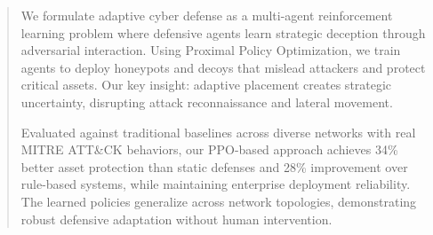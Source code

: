 \documentclass[12pt,oneside]{article}
\begin{document}



\tableofcontents
\clearpage  %

\begin{abstract}

\vspace{1em} %

We formulate adaptive cyber defense as a multi-agent reinforcement learning problem where defensive agents learn strategic deception through adversarial interaction. Using Proximal Policy Optimization, we train agents to deploy honeypots and decoys that mislead attackers and protect critical assets. Our key insight: adaptive placement creates strategic uncertainty, disrupting attack reconnaissance and lateral movement. 

Evaluated against traditional baselines across diverse networks with real MITRE ATT\&CK behaviors, our PPO-based approach achieves 34\% better asset protection than static defenses and 28\% improvement over rule-based systems, while maintaining enterprise deployment reliability. The learned policies generalize across network topologies, demonstrating robust defensive adaptation without human intervention.
\end{abstract}

\clearpage

\end{document}
